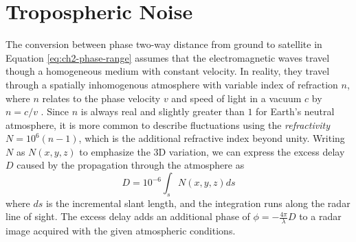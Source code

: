 


\section{Tropospheric Noise}
\label{sec:ch2-noise-tropo}



The conversion between phase two-way distance from ground to satellite in Equation \eqref{eq:ch2-phase-range} assumes that the electromagnetic waves travel though a homogeneous medium with constant velocity. In reality, they travel through a spatially inhomogenous atmosphere with variable index of refraction $n$, where $n$ relates to the phase velocity $v$ and speed of light in a vacuum $c$ by $n = c/v$ \citep{Zebker1997AtmosphericEffectsInterferometric, Hanssen2001RadarInterferometryData, Liu2012SatelliteRadarInterferometry}.  Since $n$ is always real and slightly greater than $1$ for Earth's neutral atmosphere, it is more common to describe fluctuations using the \emph{refractivity} $N = 10^{6}(n - 1)$, which is the additional refractive index beyond unity.
Writing $N$ as $N(x,y,z)$ to emphasize the 3D variation, we can express the excess delay $D$ caused by the propagation through the atmosphere as
\begin{equation}
	D = 10^{-6} \int_{s} N(x, y, z) ds
\end{equation}
where $ds$ is the incremental slant length, and the integration runs along the radar line of sight. The excess delay adds an additional phase of $\phi = - \frac{4 \pi}{\lambda} D$ to a radar image acquired with the given atmospheric conditions.

